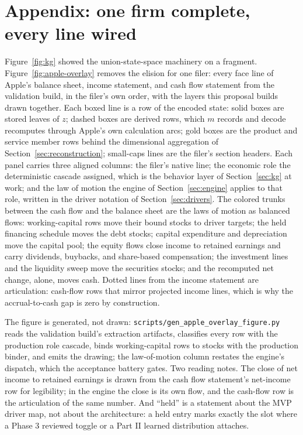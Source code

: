 \documentclass[11pt]{article}
\begin{document}
\section{Appendix: one firm complete, every line wired}
\label{app:overlay}
Figure~\ref{fig:kg} showed the union-state-space machinery on a fragment. Figure~\ref{fig:apple-overlay} removes the elision for one filer: every face line of Apple's balance sheet, income statement, and cash flow statement from the validation build, in the filer's own order, with the layers this proposal builds drawn together. Each boxed line is a row of the encoded state: solid boxes are stored leaves of $z$; dashed boxes are derived rows, which $m$ records and decode recomputes through Apple's own calculation arcs; gold boxes are the product and service member rows behind the dimensional aggregation of Section~\ref{sec:reconstruction}; small-caps lines are the filer's section headers. Each panel carries three aligned columns: the filer's native line; the economic role the deterministic cascade assigned, which is the behavior layer of Section~\ref{sec:kg} at work; and the law of motion the engine of Section~\ref{sec:engine} applies to that role, written in the driver notation of Section~\ref{sec:drivers}. The colored trunks between the cash flow and the balance sheet are the laws of motion as balanced flows: working-capital rows move their bound stocks to driver targets; the held financing schedule moves the debt stocks; capital expenditure and depreciation move the capital pool; the equity flows close income to retained earnings and carry dividends, buybacks, and share-based compensation; the investment lines and the liquidity sweep move the securities stocks; and the recomputed net change, alone, moves cash. Dotted lines from the income statement are articulation: cash-flow rows that mirror projected income lines, which is why the accrual-to-cash gap is zero by construction.

The figure is generated, not drawn: \texttt{scripts/gen\_apple\_overlay\_figure.py} reads the validation build's extraction artifacts, classifies every row with the production role cascade, binds working-capital rows to stocks with the production binder, and emits the drawing; the law-of-motion column restates the engine's dispatch, which the acceptance battery gates. Two reading notes. The close of net income to retained earnings is drawn from the cash flow statement's net-income row for legibility; in the engine the close is its own flow, and the cash-flow row is the articulation of the same number. And ``held'' is a statement about the MVP driver map, not about the architecture: a held entry marks exactly the slot where a Phase 3 reviewed toggle or a Part II learned distribution attaches.
\end{document}
